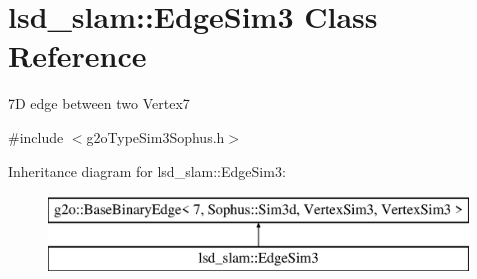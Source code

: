 \hypertarget{classlsd__slam_1_1_edge_sim3}{\section{lsd\-\_\-slam\-:\-:Edge\-Sim3 Class Reference}
\label{classlsd__slam_1_1_edge_sim3}
}


7\-D edge between two Vertex7  




{\ttfamily \#include $<$g2o\-Type\-Sim3\-Sophus.\-h$>$}

Inheritance diagram for lsd\-\_\-slam\-:\-:Edge\-Sim3\-:\begin{figure}[H]
\begin{center}
\leavevmode
\includegraphics[height=2.000000cm]{classlsd__slam_1_1_edge_sim3}
\end{center}
\end{figure}
